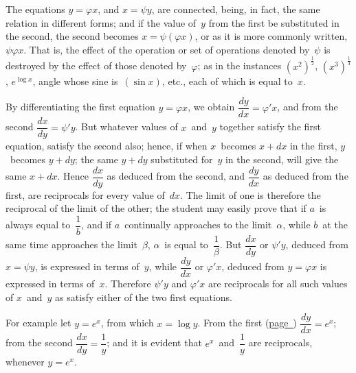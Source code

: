 \documentclass[12pt]{book}[2005/09/16]
\newcommand{\Pagelabel}[1]{\phantomsection\label{page:#1}}
\newcommand{\PageSep}[1]{\Pagelabel{#1}\ignorespaces}
\newcommand{\PageRef}[2][page]{\hyperref[page:#2]{#1~\pageref*{page:#2}}}
\renewcommand{\(}{{\upshape(}}
\renewcommand{\)}{{\upshape)}}
\renewcommand{\phi}{\varphi}
\newcommand{\efrac}[2]{\frac{#1}{#2}}
\begin{document}
The equations $y = \phi x$, and $x = \psi y$, are connected,
being, in fact, the same relation in different forms;
and if the value of~$y$ from the first be substituted in
\PageSep{103}
the second, the second becomes $x = \psi(\phi x)$, or as it is
more commonly written, $\psi\phi x$. That is, the effect of
the operation or set of operations denoted by~$\psi$ is destroyed
by the effect of those denoted by~$\phi$; as in the
instances $(x^{2})^{\efrac{1}{2}}$, $(x^{3})^{\efrac{1}{3}}$, $e^{\log x}$, angle whose sine is~$(\sin x)$,
etc., each of which is equal to~$x$.

By differentiating the first equation $y = \phi x$, we obtain
$\dfrac{dy}{dx} = \phi' x$, and from the second $\dfrac{dx}{dy} = \psi' y$. But
whatever values of $x$~and~$y$ together satisfy the first
equation, satisfy the second also; hence, if when $x$~becomes
$x + dx$ in the first, $y$~becomes $y + dy$; the same
$y + dy$ substituted for~$y$ in the second, will give the
same $x + dx$. Hence $\dfrac{dx}{dy}$ as deduced from the second,
and $\dfrac{dy}{dx}$ as deduced from the first, are reciprocals for
every value of~$dx$. The limit of one is therefore the
reciprocal of the limit of the other; the student may
easily prove that if $a$~is always equal to~$\dfrac{1}{b}$, and if $a$~continually
approaches to the limit~$\alpha$, while $b$~at the
same time approaches the limit~$\beta$, $\alpha$~is equal to~$\dfrac{1}{\beta}$.
But $\dfrac{dx}{dy}$ or $\psi' y$, deduced from $x = \psi y$, is expressed in
terms of~$y$, while $\dfrac{dy}{dx}$ or $\phi' x$, deduced from $y = \phi x$ is
expressed in terms of~$x$. Therefore $\psi' y$ and $\phi' x$ are
reciprocals for all such values of $x$~and~$y$ as satisfy
either of the two first equations.

For example let $y = e^{x}$, from which $x = \log y$. From
the first (\PageRef{20}) $\dfrac{dy}{dx} = e^{x}$; from the second $\dfrac{dx}{dy} = \dfrac{1}{y}$;
and it is evident that $e^{x}$~and~$\dfrac{1}{y}$ are reciprocals, whenever
$y = e^{x}$.
\end{document}
